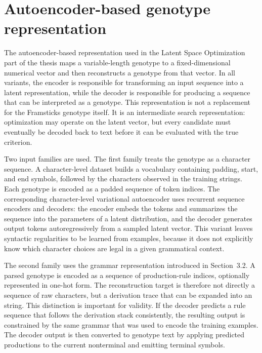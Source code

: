\section{Autoencoder-based genotype representation}

The autoencoder-based representation used in the Latent Space Optimization part of the thesis maps a variable-length \fone{} genotype to a fixed-dimensional numerical vector and then reconstructs a genotype from that vector. In all variants, the encoder is responsible for transforming an input sequence into a latent representation, while the decoder is responsible for producing a sequence that can be interpreted as a genotype. This representation is not a replacement for the Framsticks genotype itself. It is an intermediate search representation: optimization may operate on the latent vector, but every candidate must eventually be decoded back to \fone{} text before it can be evaluated with the true \vertpos{} criterion.

Two input families are used. The first family treats the genotype as a character sequence. A character-level dataset builds a vocabulary containing padding, start, and end symbols, followed by the characters observed in the training strings. Each genotype is encoded as a padded sequence of token indices. The corresponding character-level variational autoencoder uses recurrent sequence encoders and decoders: the encoder embeds the tokens and summarizes the sequence into the parameters of a latent distribution, and the decoder generates output tokens autoregressively from a sampled latent vector. This variant leaves syntactic regularities to be learned from examples, because it does not explicitly know which character choices are legal in a given grammatical context.

The second family uses the grammar representation introduced in Section~3.2. A parsed genotype is encoded as a sequence of production-rule indices, optionally represented in one-hot form. The reconstruction target is therefore not directly a sequence of raw characters, but a derivation trace that can be expanded into an \fone{} string. This distinction is important for validity. If the decoder predicts a rule sequence that follows the derivation stack consistently, the resulting output is constrained by the same grammar that was used to encode the training examples. The decoder output is then converted to genotype text by applying predicted productions to the current nonterminal and emitting terminal symbols.

